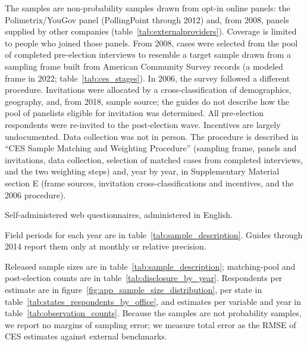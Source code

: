 \documentclass[12pt]{article}
\begin{document}
\begin{description}[style=unboxed, leftmargin=0pt, font=\normalfont\bfseries]
\item[Methods Used to Generate and Recruit the Sample:] The samples are non-probability samples drawn from opt-in online panels: the Polimetrix/YouGov panel (PollingPoint through 2012) and, from 2008, panels supplied by other companies (table~\ref{tab:externalproviders}). Coverage is limited to people who joined those panels. From 2008, cases were selected from the pool of completed pre-election interviews to resemble a target sample drawn from a sampling frame built from American Community Survey records (a modeled frame in 2022; table~\ref{tab:ces_stages}). In 2006, the survey followed a different procedure. Invitations were allocated by a cross-classification of demographics, geography, and, from 2018, sample source; the guides do not describe how the pool of panelists eligible for invitation was determined. All pre-election respondents were re-invited to the post-election wave. Incentives are largely undocumented. Data collection was not in person. The procedure is described in ``CES Sample Matching and Weighting Procedure'' (sampling frame, panels and invitations, data collection, selection of matched cases from completed interviews, and the two weighting steps) and, year by year, in Supplementary Material section E (frame sources, invitation cross-classifications and incentives, and the 2006 procedure).

\item[Method(s) and Mode(s) of Data Collection:] Self-administered web questionnaires, administered in English.

\item[Dates of Data Collection:] Field periods for each year are in table~\ref{tab:sample_description}. Guides through 2014 report them only at monthly or relative precision.

\item[Sample Sizes and Discussion of Precision:] Released sample sizes are in table~\ref{tab:sample_description}; matching-pool and post-election counts are in table~\ref{tab:disclosure_by_year}. Respondents per estimate are in figure~\ref{fig:app_sample_size_distribution}, per state in table~\ref{tab:states_respondents_by_office}, and estimates per variable and year in table~\ref{tab:observation_counts}. Because the samples are not probability samples, we report no margins of sampling error; we measure total error as the RMSE of CES estimates against external benchmarks.


\end{description}
\end{document}
